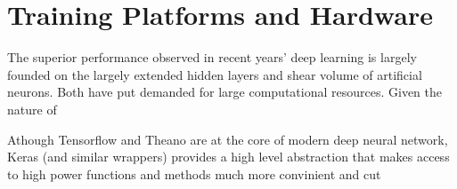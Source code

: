 \section{Training Platforms and Hardware}
The superior performance observed in recent years' deep learning is largely founded on the largely extended hidden layers and shear volume of artificial neurons. Both have put demanded for large computational resources. Given the nature of

Athough Tensorflow and Theano are at the core of modern deep neural network, Keras (and similar wrappers) provides a high level abstraction that makes access to high power functions and methods much more convinient and cut  